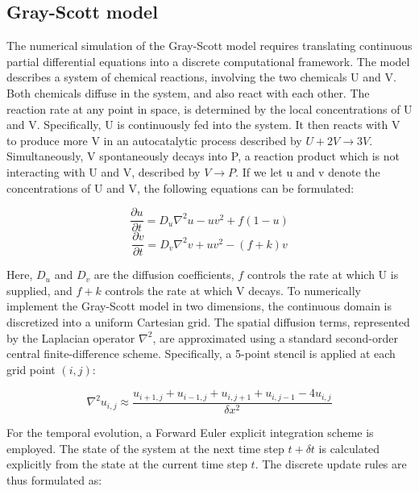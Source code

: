 \documentclass[10pt, journal]{IEEEtran}
\begin{document}
        

    
\subsection{Gray-Scott model}

    The numerical simulation of the Gray-Scott model requires translating continuous partial differential equations into a discrete computational framework. The model describes a system of chemical reactions, involving the two chemicals U and V. Both chemicals diffuse in the system, and also react with each other. The reaction rate at any point in space, is determined by the local concentrations of U and V. Specifically, U is continuously fed into the system. It then reacts with V to produce more V in an autocatalytic process described by $U+2V\rightarrow3V$. Simultaneously, V spontaneously decays into P, a reaction product which is not interacting with U and V, described by $V\rightarrow P$. If we let u and v denote the concentrations of U and V, the following equations can be formulated:

    \begin{equation}
        \frac{\partial u}{\partial t}=D_{u}\nabla^{2}u-uv^{2}+f(1-u)
    \end{equation}
    \begin{equation}
        \frac{\partial v}{\partial t}=D_{v}\nabla^{2}v+uv^{2}-(f+k)v
    \end{equation}
    
    Here, $D_u$ and $D_v$ are the diffusion coefficients, $f$ controls the rate at which U is supplied, and $f+k$ controls the rate at which V decays. To numerically implement the Gray-Scott model in two dimensions, the continuous domain is discretized into a uniform Cartesian grid. The spatial diffusion terms, represented by the Laplacian operator $\nabla^2$, are approximated using a standard second-order central finite-difference scheme.  Specifically, a 5-point stencil is applied at each grid point $(i, j)$:
    
    \begin{equation}
    \nabla^2 u_{i,j} \approx \frac{u_{i+1,j} + u_{i-1,j} + u_{i,j+1} + u_{i,j-1} - 4u_{i,j}}{\delta x^2}
    \end{equation}
    
    For the temporal evolution, a Forward Euler explicit integration scheme is employed. The state of the system at the next time step $t + \delta t$ is calculated explicitly from the state at the current time step $t$. The discrete update rules are thus formulated as:
    
\end{document}
